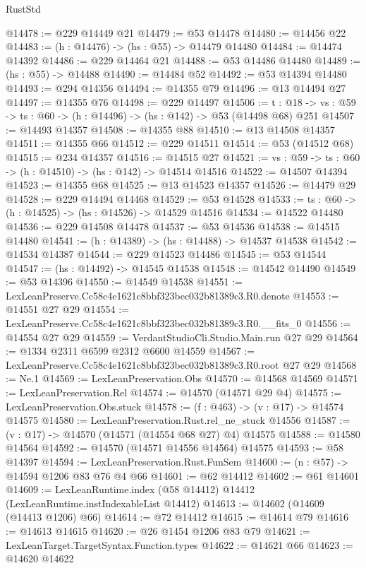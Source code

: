 \begin{lexlean}{RustStd}
\begin{coremodule}
@14478 := @229 @14449 @21
@14479 := @53 @14478
@14480 := @14456 @22
@14483 := (h : @14476) -> (hs : @55) -> @14479 @14480
@14484 := @14474 @14392
@14486 := @229 @14464 @21
@14488 := @53 @14486 @14480
@14489 := (hs : @55) -> @14488
@14490 := @14484 @52
@14492 := @53 @14394 @14480
@14493 := @294 @14356
@14494 := @14355 @79
@14496 := @13 @14494 @27
@14497 := @14355 @76
@14498 := @229 @14497
@14506 := {t : @18} ->
  {vs : @59} -> {ts : @60} -> (h : @14496) -> (hs : @142) -> @53 (@14498 @68) @251
@14507 := @14493 @14357
@14508 := @14355 @88
@14510 := @13 @14508 @14357
@14511 := @14355 @66
@14512 := @229 @14511
@14514 := @53 (@14512 @68)
@14515 := @234 @14357
@14516 := @14515 @27
@14521 := {vs : @59} -> {ts : @60} -> (h : @14510) -> (hs : @142) -> @14514 @14516
@14522 := @14507 @14394
@14523 := @14355 @68
@14525 := @13 @14523 @14357
@14526 := @14479 @29
@14528 := @229 @14494 @14468
@14529 := @53 @14528
@14533 := {ts : @60} -> (h : @14525) -> (hs : @14526) -> @14529 @14516
@14534 := @14522 @14480
@14536 := @229 @14508 @14478
@14537 := @53 @14536
@14538 := @14515 @14480
@14541 := (h : @14389) -> (hs : @14488) -> @14537 @14538
@14542 := @14534 @14387
@14544 := @229 @14523 @14486
@14545 := @53 @14544
@14547 := (hs : @14492) -> @14545 @14538
@14548 := @14542 @14490
@14549 := @53 @14396
@14550 := @14549 @14538
@14551 := LexLeanPreserve.Cc58c4e1621c8bbf323bec032b81389c3.R0.denote
@14553 := @14551 @27 @29
@14554 := LexLeanPreserve.Cc58c4e1621c8bbf323bec032b81389c3.R0.__fits_0
@14556 := @14554 @27 @29
@14559 := VerdantStudioCli.Studio.Main.run @27 @29
@14564 := @1334 @2311 @6599 @2312 @6600 @14559
@14567 := LexLeanPreserve.Cc58c4e1621c8bbf323bec032b81389c3.R0.root @27 @29
@14568 := Ne.{1}
@14569 := LexLeanPreservation.Obs
@14570 := @14568 @14569
@14571 := LexLeanPreservation.Rel
@14574 := @14570 (@14571 @29 @4)
@14575 := LexLeanPreservation.Obs.stuck
@14578 := (f : @463) -> (v : @17) -> @14574 @14575
@14580 := LexLeanPreservation.Rust.rel_ne_stuck @14556
@14587 := (v : @17) -> @14570 (@14571 (@14554 @68 @27) @4) @14575
@14588 := @14580 @14564
@14592 := @14570 (@14571 @14556 @14564) @14575
@14593 := @58 @14397
@14594 := LexLeanPreservation.Rust.FunSem
@14600 := (n : @57) -> @14594 @1206 @83 @76 @4 @66
@14601 := @62 @14412
@14602 := @61 @14601
@14609 := LexLeanRuntime.index (@58 @14412) @14412 (LexLeanRuntime.instIndexableList @14412)
@14613 := @14602 (@14609 (@14413 @1206) @66)
@14614 := @72 @14412
@14615 := @14614 @79
@14616 := @14613 @14615
@14620 := @26 @1454 @1206 @83 @79
@14621 := LexLeanTarget.TargetSyntax.Function.types
@14622 := @14621 @66
@14623 := @14620 @14622

\end{coremodule}
\end{lexlean}
